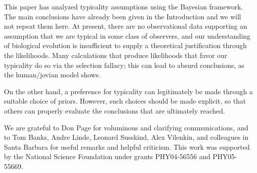 \documentclass[pra,twocolumn,nofootinbib,eqsecnum,floatfix]{revtex4}
\begin{document}
This paper has analyzed typicality assumptions using the Bayesian framework. The main conclusions have already been given in the Introduction and we will not repeat them here.  At present, there are no observational data supporting an assumption that we are typical in some class of observers, and our understanding of biological evolution is insufficient to supply a theoretical justification through the likelihoods. Many calculations that produce likelihoods that favor our typicality do so via the selection fallacy; this can lead to absurd conclusions, as the human/jovian model shows.  

On the other hand, a preference for typicality can legitimately be made through a suitable choice of priors. However, such choices should be made explicit, so that others can properly evaluate the conclusions that are ultimately reached. 

\begin{acknowledgments}

We are grateful to Don Page for voluminous and clarifying communications, and to 
Tom Banks, Andre Linde, Leonard Susskind, Alex Vilenkin, and colleagues in Santa Barbara  for useful remarks and helpful criticism.   
This work was supported
by the National Science Foundation under grants PHY04-56556 and PHY05-55669.

\end{acknowledgments}
\end{document}

